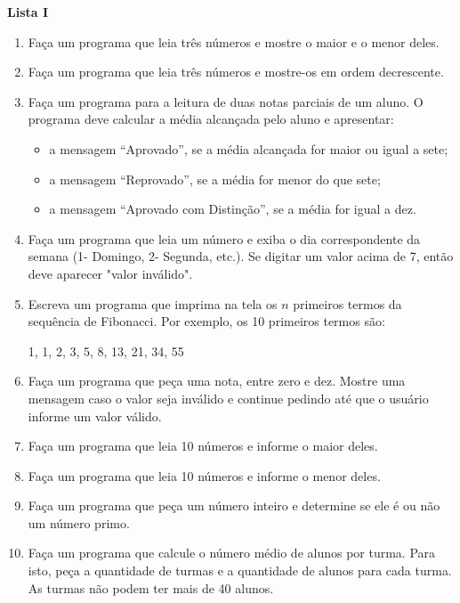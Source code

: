 \documentclass[12pt,a4paper]{article}
\begin{document}
\begin{center}
  \textbf{Lista I}
\end{center}

\begin{enumerate}
  \item Faça um programa que leia três números e mostre o maior e o menor deles.
  \item Faça um programa que leia três números e mostre-os em ordem decrescente.
  \item Faça um programa para a leitura de duas notas parciais de um aluno. O programa deve 
  calcular a média alcançada pelo aluno e apresentar:
    \begin{itemize}  
      \item a mensagem ``Aprovado'', se a média alcançada for maior ou igual a sete;
      \item a mensagem ``Reprovado'', se a média for menor do que sete;
      \item a mensagem ``Aprovado com Distinção'', se a média for igual a dez.     
    \end{itemize}
  \item Faça um programa que leia um número e exiba o dia correspondente da semana (1- Domingo,
  2- Segunda, etc.). Se digitar um valor acima de 7, então deve aparecer "valor inválido".
  \item Escreva um programa que imprima na tela os $n$ primeiros termos da sequência de Fibonacci.
  Por exemplo, os 10 primeiros termos são:
  
  \begin{center}
    1, 1, 2, 3, 5, 8, 13, 21, 34, 55
  \end{center}
  
  \item Faça um programa que peça uma nota, entre zero e dez. Mostre uma mensagem caso o valor seja
  inválido e continue pedindo até que o usuário informe um valor válido.
  
  \item Faça um programa que leia 10 números e informe o maior deles.
  
  \item Faça um programa que leia 10 números e informe o menor deles.

  \item Faça um programa que peça um número inteiro e determine se ele é ou não um número primo.
  
  \item Faça um programa que calcule o número médio de alunos por turma. Para isto,
  peça a quantidade de turmas e a quantidade de alunos para cada turma. As turmas não podem ter
  mais de 40 alunos.
  
\end{enumerate}
\end{document}
